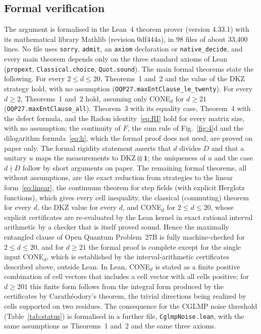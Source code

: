 \documentclass[11pt]{article}
\newcommand{\one}{\mathbf{1}}
\begin{document}
\subsection*{Formal verification}
The argument is formalised in the Lean~4 theorem prover (version 4.33.1) with its mathematical library Mathlib
(revision 0df444a)\cite{Lean2021,Mathlib2020}, in 98 files of about 33,400 lines. No file uses \texttt{sorry},
\texttt{admit}, an \texttt{axiom} declaration or \texttt{native\_decide}, and every main theorem depends only on the
three standard axioms of Lean (\texttt{propext}, \texttt{Classical.choice}, \texttt{Quot.sound}). The main formal
theorems state the following. For every $2\le d\le20$, Theorems~1 and~2 and the value of the DKZ strategy hold, with no
assumption (\nolinkurl{OQP27.maxEntClause_le_twenty}). For every $d\ge2$, Theorems~1 and~2 hold, assuming only
CONE$_d$ for $d\ge21$ (\nolinkurl{OQP27.maxEntClause_all}). Theorem~3 with its equality
case, Theorem~4 with the defect formula, and the Radon identity~\eqref{eq:RI} hold for every matrix size, with no
assumption; the continuity of $F$, the sum rule of Fig.~\ref{fig:4}d and the dilogarithm formula~\eqref{eq:h}, which the
formal proof does not need, are proved on paper only. The formal rigidity statement asserts that $d$ divides $D$ and that
a unitary $u$ maps the measurements to $\mathrm{DKZ}\otimes\one$; the uniqueness of $u$ and the case $d\nmid D$ follow by
short arguments on paper. The remaining
formal theorems, all without assumptions, are the exact reduction from strategies to the linear
form~\eqref{eq:linear}, the continuum theorem for step fields (with explicit Herglotz functions), which gives every cell
inequality, the classical (commuting) theorem for every $d$, the DKZ value for every $d$, and CONE$_d$ for
$2\le d\le20$, whose explicit certificates are re-evaluated by the Lean kernel in exact rational interval arithmetic by
a checker that is itself proved sound. Hence the maximally entangled clause of Open Quantum Problem~27B is fully
machine-checked for $2\le d\le20$, and for $d\ge21$ the formal proof is complete except for the single input CONE$_d$,
which is established by the interval-arithmetic certificates described above, outside Lean. In Lean, CONE$_d$ is stated
as a finite positive combination of cell vectors that includes a cell vector with all cells positive; for $d\ge201$ this
finite form follows from the integral form produced by the certificates by Carath\'eodory's theorem, the trivial
directions being realized by cells supported on two residues. The consequence for the CGLMP noise threshold
(Table~\ref{tab:status}) is formalised in a further file, \texttt{CglmpNoise.lean}, with the same assumptions as
Theorems~1 and~2 and the same three axioms.
\end{document}
